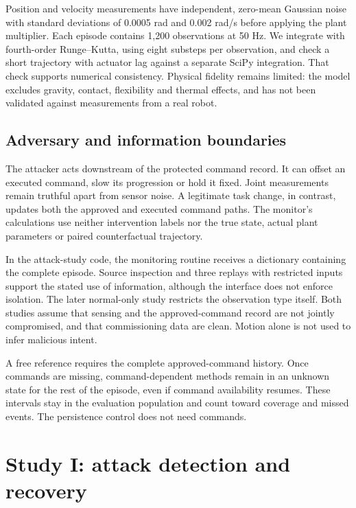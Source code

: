 \documentclass[11pt]{article}
\begin{document}
Position and velocity measurements have independent, zero-mean Gaussian noise with standard deviations of 0.0005 rad and 0.002 rad/s before applying the plant multiplier. Each episode contains 1,200 observations at 50 Hz. We integrate with fourth-order Runge--Kutta, using eight substeps per observation, and check a short trajectory with actuator lag against a separate SciPy integration. That check supports numerical consistency. Physical fidelity remains limited: the model excludes gravity, contact, flexibility and thermal effects, and has not been validated against measurements from a real robot.

\subsection{Adversary and information boundaries}
The attacker acts downstream of the protected command record. It can offset an executed command, slow its progression or hold it fixed. Joint measurements remain truthful apart from sensor noise. A legitimate task change, in contrast, updates both the approved and executed command paths. The monitor's calculations use neither intervention labels nor the true state, actual plant parameters or paired counterfactual trajectory.

In the attack-study code, the monitoring routine receives a dictionary containing the complete episode. Source inspection and three replays with restricted inputs support the stated use of information, although the interface does not enforce isolation. The later normal-only study restricts the observation type itself. Both studies assume that sensing and the approved-command record are not jointly compromised, and that commissioning data are clean. Motion alone is not used to infer malicious intent.

A free reference requires the complete approved-command history. Once commands are missing, command-dependent methods remain in an unknown state for the rest of the episode, even if command availability resumes. These intervals stay in the evaluation population and count toward coverage and missed events. The persistence control does not need commands.

\section{Study I: attack detection and recovery}
\end{document}
